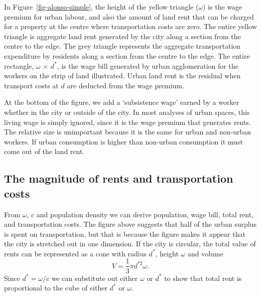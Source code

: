 In Figure~\ref{fig-alonso-simple}, the height of the yellow triangle ($\omega$) is the wage premium for urban labour, and also the amount of land rent that can be charged for a property at the centre %
where transportation costs are zero. The entire yellow triangle is aggregate land rent generated by the city along a section from the centre to the edge. 
The grey triangle represents the aggregate transportation expenditure by residents along a section from the centre to the edge. 
The entire rectangle, $\omega$ $\times$ $d^*$, is the wage bill generated by urban agglomeration for the workers on the strip of land illustrated. Urban land rent is the residual when transport costs at $d$ are deducted from the wage premium. %

At the bottom of the figure, we add a `subsistence wage'  earned by a worker whether in the city or outside of the city. In most analyses of urban spaces, this living wage is simply ignored, since it is the wage premium that generates rents.  The relative size is unimportant because it is the same for urban and non-urban workers. If urban consumption is higher than non-urban consumption it must come out of the land rent.


 \subsection{The magnitude of rents and transportation costs}
 From $\omega$, $c$ and population density we can derive population, wage bill, total rent, and transportation costs. The figure above suggests that  half of the urban surplus is spent on transportation, but that is because the figure makes it appear that the city is stretched out in one dimension. If  the city is circular, the total value of rents can be represented as  a cone with radius $d^*$, height $\omega$ and volume  \[ V=\frac{1}{3}\pi  d^{*2} \omega. \]
Since $d^*=\omega/c$ we can substitute out either  $\omega$ or  $d^*$ to show that total rent is  proportional to the cube of either  $d^*$ or $\omega$. 

